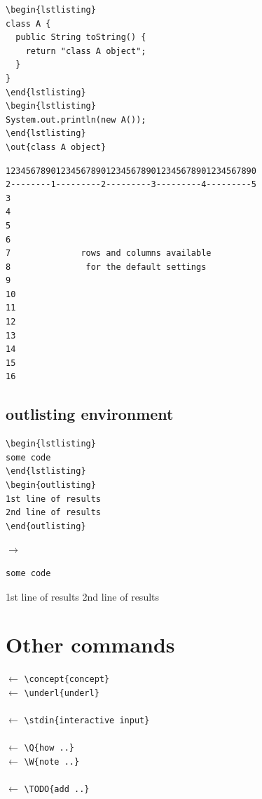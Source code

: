 \begin{verbatim}
\begin{lstlisting}
class A {
  public String toString() {
    return "class A object";
  }
}
\end{lstlisting}
\begin{lstlisting}
System.out.println(new A());
\end{lstlisting}
\out{class A object}
\end{verbatim}


\newslide

\begin{lstlisting}
12345678901234567890123456789012345678901234567890
2--------1---------2---------3---------4---------5
3
4
5
6
7              rows and columns available
8               for the default settings
9
10
11
12
13
14
15
16
\end{lstlisting}

\newslide

\subsection{outlisting environment}
\begin{verbatim}
\begin{lstlisting}
some code
\end{lstlisting}
\begin{outlisting}
1st line of results
2nd line of results
\end{outlisting}
\end{verbatim}

$\to$

\begin{lstlisting}
some code
\end{lstlisting}
\begin{outlisting}
1st line of results
2nd line of results
\end{outlisting}

\newslide
\section{Other commands}


 $\leftarrow$ \verb|\concept{concept}|\\
 $\leftarrow$ \verb|\underl{underl}|\\
~\\
 $\leftarrow$ \verb|\stdin{interactive input}|\\
~\\
 $\leftarrow$ \verb|\Q{how ..}|\\
 $\leftarrow$ \verb|\W{note ..}|\\
~\\
 $\leftarrow$ \verb|\TODO{add ..}|\\

